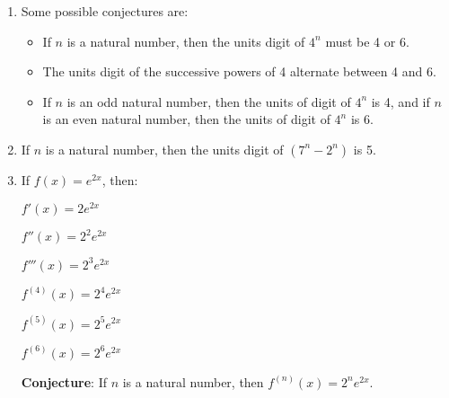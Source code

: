\documentclass[11pt]{article}
\begin{document}
\begin{enumerate}
\item Some possible conjectures are:
\begin{itemize}
\item If $n$ is a natural number, then the units digit of $4^n$ must be 4 or 6.
\item The units digit of the successive powers of 4 alternate between 4 and 6.
\item If $n$ is an odd natural number, then the units of digit of $4^n$ is 4, and if $n$ is an even natural number, then the units of digit of $4^n$ is 6.
\end{itemize}

\item If $n$ is a natural number, then the units digit of $\left( 7^n - 2^n \right)$ is 5.

\item If $f(x) = e^{2x}$, then:
\begin{multicols}{3}
$f'(x) = 2e^{2x}$

$f''(x) = 2^2 e^{2x}$

$f'''(x) = 2^3 e^{2x}$

$f^{(4)}(x) = 2^4 e^{2x}$

$f^{(5)}(x) = 2^5 e^{2x}$

$f^{(6)}(x) = 2^6 e^{2x}$
\end{multicols}

\textbf{Conjecture}:  If $n$ is a natural number, then $f^{(n)}(x) = 2^n e^{2x}$.



\end{enumerate}
\end{document}
